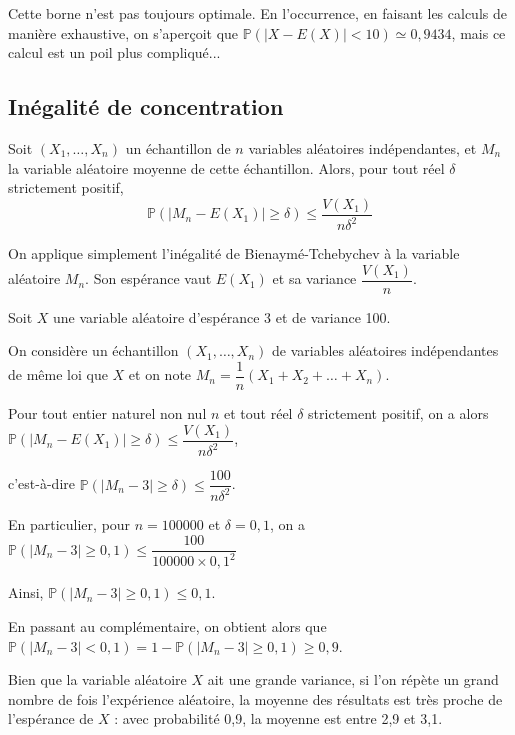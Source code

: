 \documentclass[11pt,fleqn, openany]{book} %
\begin{document}
Cette borne n'est pas toujours optimale. En l'occurrence, en faisant les calculs de manière exhaustive, on s'aperçoit que $\mathbb{P}( |X-E(X)| < 10) \simeq 0,9434$, mais ce calcul est un poil plus compliqué...



\subsection{Inégalité de concentration}

\begin{proposition} Soit $(X_1,\ldots,X_n)$ un échantillon de $n$ variables aléatoires indépendantes, et $M_n$ la variable aléatoire moyenne de cette échantillon. Alors, pour tout réel $\delta$ strictement positif,
\[ \mathbb{P}(|M_n-E(X_1)|\geqslant \delta ) \leqslant \dfrac{V(X_1)}{n\delta^2}\]\end{proposition}

\begin{demonstration} On applique simplement l'inégalité de Bienaymé-Tchebychev à la variable aléatoire $M_n$. Son espérance vaut $E(X_1)$ et sa variance $\dfrac{V(X_1)}{n}$.\end{demonstration}

\begin{example} Soit $X$ une variable aléatoire d'espérance 3 et de variance 100.

 On considère un échantillon $(X_1, \ldots, X_n)$ de variables aléatoires indépendantes de même loi que $X$ et on note $M_n = \dfrac{1}{n} (X_1+X_2+\ldots + X_n)$.

Pour tout entier naturel non nul $n$ et tout réel $\delta$ strictement positif, on a alors $\mathbb{P}(|M_n-E(X_1)|\geqslant \delta ) \leqslant \dfrac{V(X_1)}{n\delta ^2}$,

c'est-à-dire $\mathbb{P}(|M_n-3|\geqslant \delta ) \leqslant \dfrac{100}{n \delta ^2}$.

En particulier, pour $n=100000$ et $\delta=0,1$, on a $\mathbb{P}(|M_n-3|\geqslant 0,1 ) \leqslant \dfrac{100}{100000 \times 0,1^2}$

Ainsi, $\mathbb{P}(|M_n-3|\geqslant 0,1 ) \leqslant 0,1$.

En passant au complémentaire, on obtient alors que $\mathbb{P}(|M_n-3| < 0,1 ) = 1 - \mathbb{P}(|M_n-3|\geqslant 0,1 ) \geqslant 0,9$.

Bien que la variable aléatoire $X$ ait une grande variance, si l'on répète un grand nombre de fois l'expérience aléatoire, la moyenne des résultats est très proche de l'espérance de $X$ : avec probabilité 0,9, la moyenne est entre 2,9 et 3,1.\end{example}
\end{document}
